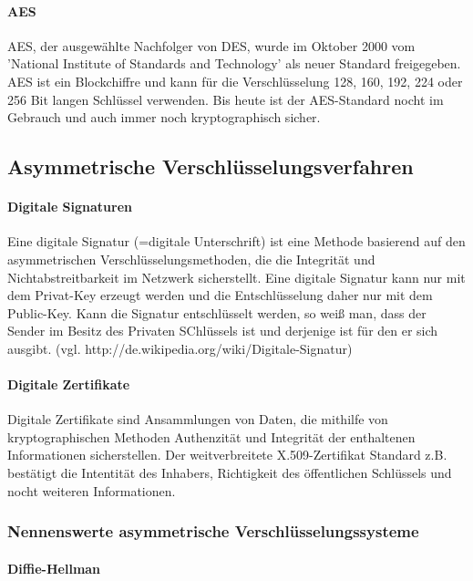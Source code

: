 \documentclass[12pt,a4paper]{report}
\begin{document}
\paragraph{AES}

AES, der ausgewählte Nachfolger von DES, wurde im Oktober 2000 vom 'National Institute of Standards and Technology' als neuer Standard freigegeben. AES ist ein Blockchiffre und kann für die Verschlüsselung 128, 160, 192, 224 oder 256 Bit langen Schlüssel verwenden. Bis heute ist der AES-Standard nocht im Gebrauch und auch immer noch kryptographisch sicher.

\subsection{Asymmetrische Verschlüsselungsverfahren}

\paragraph{Digitale Signaturen}

Eine digitale Signatur (=digitale Unterschrift) ist eine Methode basierend auf den asymmetrischen Verschlüsselungsmethoden, die die Integrität und Nichtabstreitbarkeit im Netzwerk sicherstellt. Eine digitale Signatur kann nur mit dem Privat-Key erzeugt werden und die Entschlüsselung daher nur mit dem Public-Key. Kann die Signatur entschlüsselt werden, so weiß man, dass der Sender im Besitz des Privaten SChlüssels ist und derjenige ist für den er sich ausgibt. (vgl. http://de.wikipedia.org/wiki/Digitale-Signatur)

\paragraph{Digitale Zertifikate}

Digitale Zertifikate sind Ansammlungen von Daten, die mithilfe von kryptographischen Methoden Authenzität und Integrität der enthaltenen Informationen sicherstellen. Der weitverbreitete X.509-Zertifikat Standard z.B. bestätigt die Intentität des Inhabers, Richtigkeit des öffentlichen Schlüssels und nocht weiteren Informationen.

\subsubsection{Nennenswerte asymmetrische Verschlüsselungssysteme}

\paragraph{Diffie-Hellman}
\end{document}
